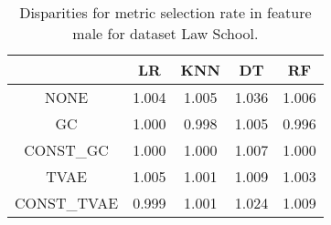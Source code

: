 \begin{table}
\caption{Disparities for metric selection rate in feature male for dataset Law School.}
\label{tab:disp-LAW SCHOOL-male-selection_rate}
\begin{tabular}{ccccc}
\toprule
 & LR & KNN & DT & RF \\
\midrule
NONE & 1.004 & 1.005 & 1.036 & 1.006 \\
GC & 1.000 & 0.998 & 1.005 & 0.996 \\
CONST\_GC & 1.000 & 1.000 & 1.007 & 1.000 \\
TVAE & 1.005 & 1.001 & 1.009 & 1.003 \\
CONST\_TVAE & 0.999 & 1.001 & 1.024 & 1.009 \\
\bottomrule
\end{tabular}
\end{table}
